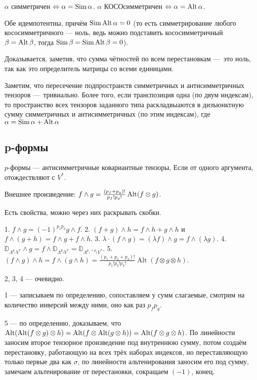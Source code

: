 \documentclass[12pt, a4paper]{article}
\begin{document}
$\alpha$ симметричен $\Leftrightarrow \alpha = \operatorname{Sim} \alpha$.
$\alpha$ КОСОсимметричен $\Leftrightarrow \alpha = \operatorname{Alt} \alpha$.

Обе идемпотентны, причём $\operatorname{Sim} \operatorname{Alt} \alpha = 0$ 
(то есть симметрирование любого кососимметричного — ноль, ведь можно подставить кососимметричный
$\beta = \operatorname{Alt} \beta$, тогда $\operatorname{Sim} \beta = \operatorname{Sim} \operatorname{Alt} \beta = 0$).

Доказывается, заметив, что сумма чётностей по всем перестановкам — это ноль, 
так как это определитель матрицы со всеми единицами.

Заметим, что пересечение подпространств симметричных и антисимметричных тензоров — тривиально.
Более того, если транспозиция одна (по двум индексам), 
то пространство всех тензоров заданного типа раскладвыаются в дизъюнктную сумму симметричных и антисимметричных (по этим индексам), 
где $\alpha = \operatorname{Sim} \alpha + \operatorname{Alt} \alpha$

\subsection{p-формы}

$p$-формы — антисимметричные ковариантные тензоры, Если от одного аргумента, отождествляют с $V^*$.

Внешнее произведение: $f \land g = \frac{(p_f + p_g)!}{p_f! p_g!} \operatorname{Alt} (f \otimes g)$.

Есть свойства, можно через них раскрывать скобки.

1. $f \wedge g=(-1)^{p_{1} p_{2}} g \wedge f$.
2. $(f+g) \wedge h=f \wedge h+g \wedge h$ и $f \wedge(g+h)=f \wedge g+f \wedge h$.
3. $\lambda \cdot(f \wedge g)=(\lambda f) \wedge g=f \wedge(\lambda g)$.
4. $\mathbb{D}_{\Lambda^{p_{1}} V^{*}} \wedge g=f \wedge \mathbb{\mathbb { D }}_{\Lambda^{p_{2}} V^{*}}=\mathbb{D}_{\Lambda^{p_{1}+p_{2}} V^{*}}$.
5. $(f \wedge g) \wedge h=f \wedge(g \wedge h)=\frac{\left(p_{1}+p_{2}+p_{3}\right) !}{p_{1} ! p_{2} ! p_{3} !} \operatorname{Alt}(f \otimes g \otimes h)$.

2, 3, 4 — очевидно.

1 — записываем по определению, сопоставляем у сумм слагаемые, 
смотрим на количество инверсий между ними, оно как раз $p_f p_g$.

5 — по определению, доказываем, что $\operatorname{Alt}(\operatorname{Alt}(f \otimes g) \otimes h) = \operatorname{Alt}(f \otimes \operatorname{Alt}(g \otimes h)) = \operatorname{Alt}(f \otimes g \otimes h)$.
По линейности заносим второе тензорное произведение под внутреннюю сумму, 
потом создаём перестановку, работающую на всех трёх наборах индексов, но переставляющую только первые два как $\sigma$,
по линейности альтенирования заносим его под сумму, замечаем альтенирование от перестановки, сокращаем $(-1)$, конец.
\end{document}
